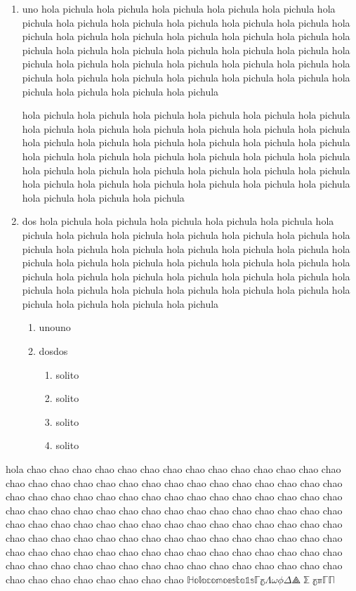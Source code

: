 \begin{enumerate}
\item uno hola pichula hola pichula hola pichula hola pichula hola pichula hola pichula hola pichula hola pichula hola pichula hola pichula hola pichula hola pichula hola pichula hola pichula hola pichula hola pichula hola pichula hola pichula hola pichula hola pichula hola pichula hola pichula hola pichula hola pichula hola pichula hola pichula hola pichula hola pichula hola pichula hola pichula hola pichula hola pichula hola pichula hola pichula hola pichula hola pichula hola pichula hola pichula hola pichula

hola pichula hola pichula hola pichula hola pichula hola pichula hola pichula hola pichula hola pichula hola pichula hola pichula hola pichula hola pichula hola pichula hola pichula hola pichula hola pichula hola pichula hola pichula hola pichula hola pichula hola pichula hola pichula hola pichula hola pichula hola pichula hola pichula hola pichula hola pichula hola pichula hola pichula hola pichula hola pichula hola pichula hola pichula hola pichula hola pichula hola pichula hola pichula hola pichula  \protect{}
\item dos hola pichula hola pichula hola pichula hola pichula hola pichula hola pichula hola pichula hola pichula hola pichula hola pichula hola pichula hola pichula hola pichula hola pichula hola pichula hola pichula hola pichula hola pichula hola pichula hola pichula hola pichula hola pichula hola pichula hola pichula hola pichula hola pichula hola pichula hola pichula hola pichula hola pichula hola pichula hola pichula hola pichula hola pichula hola pichula hola pichula hola pichula hola pichula hola pichula \cite{ahu61}
\begin{enumerate}
\item unouno
\item dosdos
\begin{enumerate}
\item solito
\item solito
\item solito
\item solito
\end{enumerate}
\end{enumerate}
\end{enumerate}

hola chao chao chao chao chao chao chao chao chao chao chao chao chao chao chao chao chao  chao \cite{ab94} chao chao chao chao chao chao chao chao chao chao chao chao chao chao chao chao chao chao chao chao chao chao chao chao chao chao chao chao chao chao chao chao chao chao chao chao chao chao chao chao chao chao chao chao chao chao chao chao chao chao chao chao chao chao chao chao chao chao chao chao chao chao chao chao chao chao chao chao chao chao chao chao chao chao chao chao chao chao chao chao chao chao chao chao chao chao chao chao chao chao chao chao chao chao chao chao chao chao chao chao chao chao chao chao chao chao chao chao chao $\mathbb{Hola como esta1s\Gamma\gamma\Lambda\omega\phi\Delta}⟁⅀ℽℼℾℿ$

